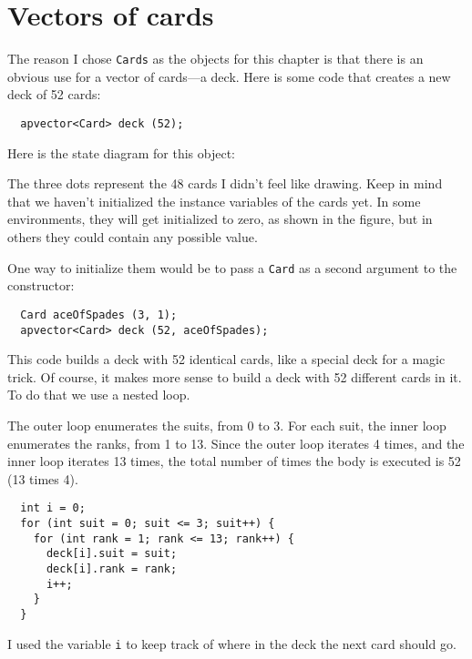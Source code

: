 \section{Vectors of cards}

The reason I chose {\tt Cards} as the objects for this chapter is that
there is an obvious use for a vector of cards---a deck.  Here is some
code that creates a new deck of 52 cards:

\begin{verbatim}
  apvector<Card> deck (52);
\end{verbatim}
%
Here is the state diagram for this object:


\vspace{0.1in}
\centerline{}
\vspace{0.1in}

The three dots represent the 48 cards I didn't feel like
drawing.  Keep in mind that we haven't initialized the instance
variables of the cards yet.  In some environments, they will get
initialized to zero, as shown in the figure, but in others they
could contain any possible value.

One way to initialize them would be to pass a {\tt Card} as
a second argument to the constructor:

\begin{verbatim}
  Card aceOfSpades (3, 1);
  apvector<Card> deck (52, aceOfSpades);
\end{verbatim}
%
This code builds a deck with 52 identical cards, like
a special deck for a magic trick.  Of course,
it makes more sense to build a deck with 52 different cards
in it.  To do that we use a nested loop.


The outer loop enumerates the suits, from 0 to 3.  For
each suit, the inner loop enumerates the ranks, from 1
to 13.  Since the outer loop iterates 4 times, and
the inner loop iterates 13 times, the total number of times
the body is executed is 52 (13 times 4).

\begin{verbatim}
  int i = 0;
  for (int suit = 0; suit <= 3; suit++) {
    for (int rank = 1; rank <= 13; rank++) {
      deck[i].suit = suit;
      deck[i].rank = rank;
      i++;
    }
  }
\end{verbatim}
%
I used the variable {\tt i} to keep track of where in the
deck the next card should go.

